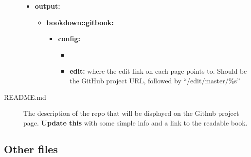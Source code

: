 \documentclass[
]{book}
\providecommand{\tightlist}{%
  \setlength{\itemsep}{0pt}\setlength{\parskip}{0pt}}
\begin{document}
\begin{description}
\begin{itemize}
\tightlist
\item
  \textbf{output:}

  \begin{itemize}
  \tightlist
  \item
    \textbf{bookdown::gitbook:}

    \begin{itemize}
    \tightlist
    \item
      \textbf{config:}

      \begin{itemize}
      \item
      \item
        \textbf{edit:} where the edit link on each page points to. Should be the GitHub project URL, followed by ``/edit/master/\%s''
      \end{itemize}
    \end{itemize}
  \end{itemize}
\end{itemize}
\item[README.md]
The description of the repo that will be displayed on the Github project page. \textbf{Update this} with some simple info and a link to the readable book.
\end{description}

\hypertarget{other-files}{%
\subsection{Other files}\label{other-files}}
\end{document}

